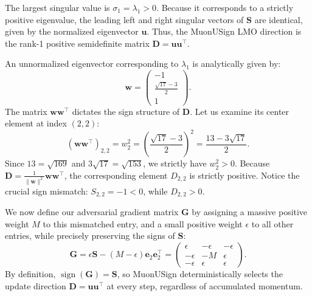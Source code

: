 \documentclass[letterpaper]{article} %
\begin{document}
The largest singular value is $\sigma_1 = \lambda_1 > 0$. Because it corresponds to a strictly positive eigenvalue, the leading left and right singular vectors of $\mathbf{S}$ are identical, given by the normalized eigenvector $\mathbf{u}$. Thus, the MuonUSign LMO direction is the rank-1 positive semidefinite matrix $\mathbf{D} = \mathbf{u}\mathbf{u}^\top$.

An unnormalized eigenvector corresponding to $\lambda_1$ is analytically given by:
\begin{equation}
\mathbf{w} = \begin{pmatrix} -1 \\ \frac{\sqrt{17}-3}{2} \\ 1 \end{pmatrix}.
\end{equation}
The matrix $\mathbf{w}\mathbf{w}^\top$ dictates the sign structure of $\mathbf{D}$. Let us examine its center element at index $(2,2)$:
\begin{equation}
(\mathbf{w}\mathbf{w}^\top)_{2,2} = w_2^2 = \left(\frac{\sqrt{17}-3}{2}\right)^2 = \frac{13-3\sqrt{17}}{2}.
\end{equation}
Since $13 = \sqrt{169}$ and $3\sqrt{17} = \sqrt{153}$, we strictly have $w_2^2 > 0$. Because $\mathbf{D} = \frac{1}{\|\mathbf{w}\|^2} \mathbf{w}\mathbf{w}^\top$, the corresponding element $D_{2,2}$ is strictly positive. Notice the crucial sign mismatch: $S_{2,2} = -1 < 0$, while $D_{2,2} > 0$.

We now define our adversarial gradient matrix $\mathbf{G}$ by assigning a massive positive weight $M$ to this mismatched entry, and a small positive weight $\epsilon$ to all other entries, while precisely preserving the signs of $\mathbf{S}$:
\begin{equation}
\mathbf{G} = \epsilon \mathbf{S} - (M - \epsilon) \mathbf{e}_2 \mathbf{e}_2^\top = \begin{pmatrix} \epsilon & -\epsilon & -\epsilon \\ -\epsilon & -M & \epsilon \\ -\epsilon & \epsilon & \epsilon \end{pmatrix}.
\end{equation}
By definition, $\operatorname{sign}(\mathbf{G}) = \mathbf{S}$, so MuonUSign deterministically selects the update direction $\mathbf{D} = \mathbf{u}\mathbf{u}^\top$ at every step, regardless of accumulated momentum.
\end{document}
